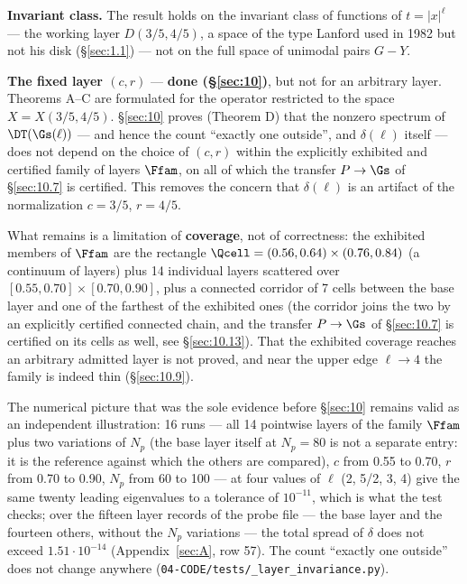\textbf{Invariant class.} The result holds on the invariant class of
functions of $t=|x|^{\ell}$ --- the working layer $D(3/5,4/5)$, a space of the type
Lanford used in 1982 \cite{lanford1982computer} but not his disk (\S\ref{sec:1.1}) --- not
on the full space of unimodal pairs $G-Y$.

\textbf{The fixed layer $(c, r)$} --- \textbf{done (\S\ref{sec:10})}, but not for an
arbitrary layer. Theorems A--C are formulated for the operator
restricted to the space $X = X(3/5, 4/5)$. \S\ref{sec:10}{} proves (Theorem D)
that the nonzero spectrum of $\DT(\Gs(\ell))$ --- and hence the count
``exactly one outside'', and $\delta(\ell)$ itself --- does not depend on the
choice of $(c, r)$ within the explicitly exhibited and certified family of
layers $\Ffam$, on all of which the transfer $P\to\Gs$ of \S\ref{sec:10.7}
is certified. This removes the
concern that $\delta(\ell)$ is an artifact of the normalization $c = 3/5$,
$r = 4/5$.

What remains is a limitation of \textbf{coverage}, not of correctness:
the exhibited members of $\Ffam$ are the rectangle $\Qcell = (0.56, 0.64) \times (0.76, 0.84)$
(a continuum of layers) plus 14 individual layers scattered over
$[0.55, 0.70] \times [0.70, 0.90]$, plus a connected corridor of 7 cells
between the base layer and one of the farthest of the exhibited ones (the
corridor joins the two by an explicitly certified connected chain, and the transfer
$P\to\Gs$ of \S\ref{sec:10.7}{} is certified on its cells as well,
see \S\ref{sec:10.13}). That the exhibited coverage reaches an arbitrary
admitted layer is not proved, and near the upper edge
$\ell \to 4$ the family is indeed thin (\S\ref{sec:10.9}).

The numerical picture that was the sole evidence before \S\ref{sec:10}{} remains
valid as an independent illustration: 16 runs --- all 14 pointwise layers of the
family $\Ffam$ plus two variations of $N_p$ (the base layer itself at
$N_p = 80$ is not a separate entry: it is the reference against which
the others are compared), $c$ from 0.55 to 0.70, $r$ from 0.70 to
0.90, $N_p$ from 60 to 100 --- at four values of $\ell$ (2, 5/2, 3, 4) give
the same twenty leading eigenvalues to a tolerance of $10^{-11}$, which
is what the test checks; over the fifteen layer records of the probe file ---
the base layer and the fourteen others, without the $N_p$ variations --- the
total spread of $\delta$ does not
exceed $1.51\cdot 10^{-14}$ (Appendix~\ref{sec:A}, row 57). The count ``exactly one
outside'' does not change anywhere (\texttt{04-\allowbreak CODE/\allowbreak tests/\allowbreak \_\allowbreak layer\_\allowbreak invariance.py}).

